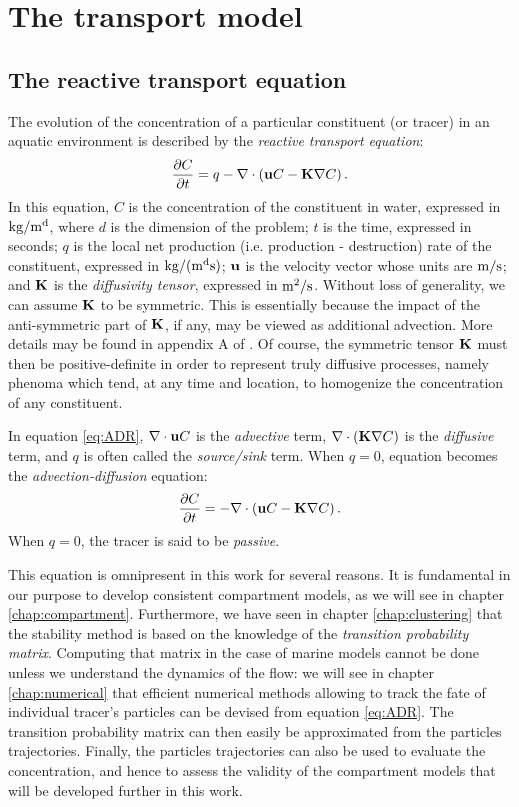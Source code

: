 \chapter{The transport model}
\section{The reactive transport equation}
The evolution of the concentration of a particular constituent (or tracer) in an aquatic environment is described by the \textit{reactive transport equation}:
\begin{equation}\label{eq:ADR}
	\frac{\partial C}{\partial t} = q-\nabla \cdot \left(\b uC - \b K \nabla C\right).
\end{equation}
In this equation, $C$ is the concentration of the constituent in water, expressed in $\rm{kg/m^d}$, where $d$ is the dimension of the problem; $t$ is the time, expressed in seconds; $q$ is the local net production (i.e. production - destruction) rate of the constituent, expressed in $\rm{kg/(m^ds)}$; $\b u$ is the velocity vector whose units are $\rm{m/s}$; and $\b K$ is the \textit{diffusivity tensor}, expressed in $\rm{m^2/s}$. Without loss of generality, we can assume $\b K$ to be symmetric. This is essentially because the impact of the anti-symmetric part of $\b K$, if any, may be viewed as additional advection. More details may be found in appendix A of \cite{deleersnijder2001concept}. Of course, the symmetric tensor $\b K$ must then be positive-definite in order to represent truly diffusive processes, namely phenoma which tend, at any time and location, to homogenize the concentration of any constituent.

In equation \eqref{eq:ADR}, $\nabla \cdot \b u C$ is the \textit{advective} term, $\nabla \cdot (\b K \nabla C)$ is the \textit{diffusive} term, and $q$ is often called the \textit{source/sink} term. When $q=0$, equation becomes the \textit{advection-diffusion} equation:
\begin{equation}\label{eq:C_PDE_vec}
 	\frac{\partial C}{\partial t} = -\nabla \cdot \left(\b uC - \b K \nabla C\right).
 \end{equation}
 When $q=0$, the tracer is said to be \textit{passive}.

This equation is omnipresent in this work for several reasons. It is fundamental in our purpose to develop consistent compartment models, as we will see in chapter \ref{chap:compartment}. Furthermore, we have seen in chapter \ref{chap:clustering} that the stability method is based on the knowledge of the \textit{transition probability matrix}. Computing that matrix in the case of marine models cannot be done unless we understand the dynamics of the flow: we will see in chapter \ref{chap:numerical} that efficient numerical methods allowing to track the fate of individual tracer's particles can be devised from equation \eqref{eq:ADR}. The transition probability matrix can then easily be approximated from the particles trajectories. Finally, the particles trajectories can also be used to evaluate the concentration, and hence to assess the validity of the compartment models that will be developed further in this work.

